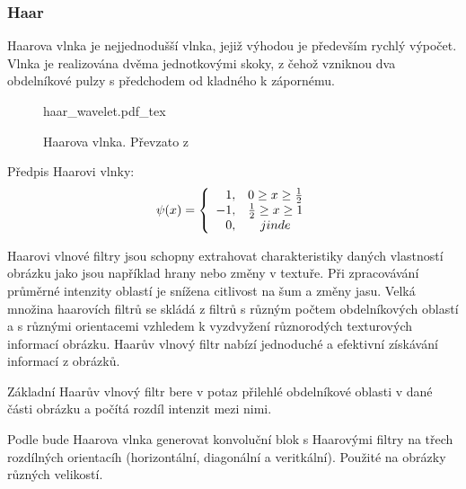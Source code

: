 \documentclass[czech,BP]{thesiskiv}
\begin{document}
\subsubsection{Haar}
\par Haarova vlnka je nejjednodušší vlnka, jejiž výhodou je především rychlý výpočet. Vlnka je realizována dvěma jednotkovými skoky, z čehož vzniknou dva obdelníkové pulzy s předchodem od kladného k zápornému. 

\begin{figure}[H]
    \centering
    \def\svgwidth{200px}
    {haar_wavelet.pdf_tex} 
    \caption{Haarova vlnka. Převzato z \cite{HaarWiky}}
\end{figure} 

Předpis Haarovi vlnky: 
\begin{displaymath} 
	\label{haar} 
		    \psi(x) = \left\{ \begin{array}{r@{\quad}c}
    		1, & 0 \geq x \geq \frac{1}{2} \\
    		-1, & \frac{1}{2} \geq x \geq 1 \\ 
    		0, & jinde \\  \end{array} \right. 
\end{displaymath} 
\vspace{1cm}


\par Haarovi vlnové filtry jsou schopny extrahovat charakteristiky daných vlastností obrázku jako jsou například hrany nebo změny v textuře.  Při zpracovávání průměrné intenzity oblastí je snížena citlivost na šum a změny jasu. Velká množina haarovích filtrů se skládá z filtrů s různým počtem obdelníkových oblastí a s různými orientacemi vzhledem k vyzdvyžení různorodých texturových informací obrázku. Haarův vlnový filtr nabízí jednoduché a efektivní získávání informací z obrázků.
\par Základní Haarův vlnový filtr bere v potaz přilehlé obdelníkové oblasti v dané části obrázku a počítá rozdíl intenzit mezi nimi. 
 
\par Podle \citep{JEC} bude Haarova vlnka generovat konvoluční blok s Haarovými filtry na třech rozdílných orientacíh (horizontální, diagonální a veritkální). Použité na obrázky různých velikostí.  
 
\end{document}
